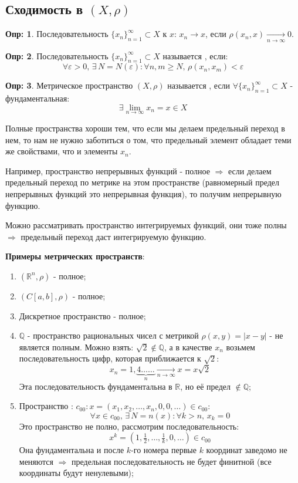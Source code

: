 \documentclass[12pt]{article}
\newcommand{\MR}{\mathbb{R}}
\newcommand{\MQ}{\mathbb{Q}}
\newcommand{\VE}{\varepsilon}
\theoremstyle{definition}
\newtheorem{defn}{Опр:}
\begin{document}
\subsection*{Сходимость в $(X,\rho)$}
\begin{defn}
	Последовательность $\{x_n\}_{n = 1}^{\infty}\subset X$  к $x$: $x_n \to x$, если $\rho(x_n,x) \xrightarrow[n \to \infty]{} 0$.
\end{defn}
\begin{defn}
	Последовательность $\{x_n\}_{n = 1}^{\infty}\subset X$ называется , если:
	$$
		\forall \VE > 0, \, \exists \, N = N(\VE) \colon \forall n,m\geq N, \, \rho(x_n, x_m) < \VE
	$$
\end{defn}
\begin{defn}
	Метрическое пространство $(X,\rho)$ называется , если $\forall \{x_n\}_{n = 1}^{\infty}\subset X$ - фундаментальная:
	$$
		\exists \lim\limits_{n\to\infty}x_n = x \in X
	$$
\end{defn}
Полные пространства хороши тем, что если мы делаем предельный переход в нем, то нам не нужно заботиться о том, что предельный элемент обладает теми же свойствами, что и элементы $x_n$. 

Например, пространство непрерывных функций - полное $\Rightarrow$ если делаем предельный переход по метрике на этом пространстве (равномерный предел непрерывных функций это непрерывная функция), то получим непрерывную функцию.

Можно рассматривать пространство интегрируемых функций, они тоже полны $\Rightarrow$ предельный переход даст интегрируемую функцию.

\textbf{Примеры метрических пространств}:
\begin{enumerate}[label=\arabic*)]
	\item $(\MR^n,\rho)$ - полное;
	\item $(C[a,b],\rho)$ - полное;
	\item Дискретное пространство - полное;
	\item $\MQ$ - пространство рациональных чисел с метрикой $\rho(x,y) = |x - y|$ - не является полным. Можно взять: $\sqrt{2} \not\in \MQ$, а в качестве $x_n$ возьмем последовательность цифр, которая приближается к $\sqrt{2}$:
	$$
		x_n = 1,\underbrace{4\dotsc\dotsc}_{n} \xrightarrow[n \to \infty]{}x = x\sqrt{2}
	$$
	Эта последовательность фундаментальна в $\MR$, но её предел $\not\in \MQ$;
	\item Пространство : $c_{00}\colon x = (x_1,x_2, \dotsc, x_n, 0, 0 , \dotsc) \in c_{00}$:
	$$
		\forall x \in c_{00}, \, \exists \, N = n(x) \colon \forall k > n, \, x_k = 0
	$$
	Это пространство не полно, рассмотрим последовательность:
	$$
		x^k = \left(1,\tfrac{1}{2}, \dotsc, \tfrac{1}{k}, 0 , \dotsc \right) \in c_{00}
	$$
	Она фундаментальна и после $k$-го номера первые $k$ координат заведомо не меняются $\Rightarrow$ предельная последовательность не будет финитной (все координаты будут ненулевыми);
\end{enumerate}
\newpage
\end{document}
